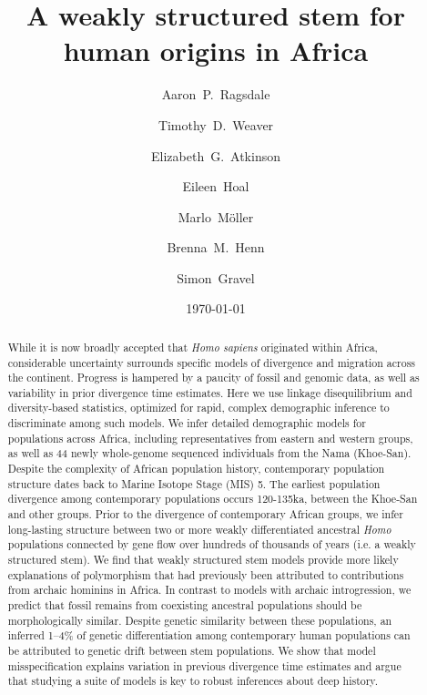 \documentclass[]{article}
\begin{document}
\title{A weakly structured stem for human origins in Africa}
\author[1]{Aaron~P.~Ragsdale}
\author[2]{Timothy~D.~Weaver}
\author[3]{Elizabeth~G.~Atkinson}
\author[4]{Eileen~Hoal}
\author[4]{Marlo~M\"{o}ller}
\author[2,5,$\dag$,*]{Brenna~M.~Henn}
\author[6,$\dag$,**]{Simon~Gravel}
\date{\normalsize \today}
\maketitle

\begin{abstract}
While it is now broadly accepted that \emph{Homo sapiens}
originated within Africa, considerable
uncertainty surrounds specific models of divergence and migration across the
continent. Progress is hampered by a paucity of fossil and genomic data, as
well as variability in prior divergence time estimates.
Here we use linkage disequilibrium and
diversity-based statistics, optimized for rapid, complex demographic inference
to discriminate among such models.
We infer detailed demographic models for
populations across Africa, including representatives from eastern and western
groups, as well as 44 newly whole-genome sequenced individuals from the Nama
(Khoe-San). Despite the complexity of African population history, contemporary
population structure dates back to Marine Isotope Stage (MIS) 5. The earliest
population divergence among contemporary populations occurs 120-135ka, between
the Khoe-San and other groups. Prior to the divergence of contemporary African
groups, we infer long-lasting structure between two or more weakly
differentiated ancestral \emph{Homo}
populations connected by gene flow over
hundreds of thousands of years (i.e. a weakly structured stem). We find that
weakly structured stem models provide more likely explanations of polymorphism
that had previously been attributed to contributions from archaic hominins in
Africa.
In contrast to models with archaic introgression, we predict that fossil
remains from coexisting ancestral populations should be morphologically
similar.
Despite genetic similarity between these populations, an inferred 1--4\%
of genetic differentiation among contemporary human populations can be
attributed to genetic drift between stem populations.
We show that model misspecification explains variation in previous
divergence time estimates and argue that studying a suite of models is key to
robust inferences about deep history.
\end{abstract}
\end{document}
